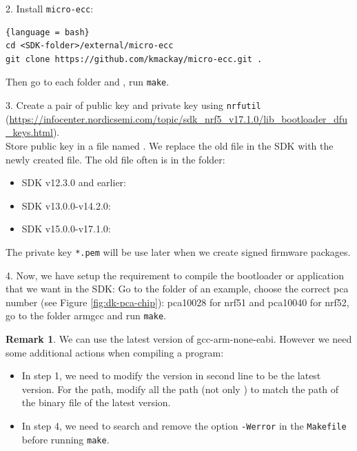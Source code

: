 \documentclass{article}
\theoremstyle{plain}
\theoremstyle{definition}
\newtheorem{remark}{Remark}
\numberwithin{equation}{section}
\begin{document}
2. Install \texttt{micro-ecc}:
\begin{lstlisting}{language = bash}
cd <SDK-folder>/external/micro-ecc
git clone https://github.com/kmackay/micro-ecc.git .
\end{lstlisting}
Then go to each folder  and , run \texttt{make}.

3. Create a pair of public key and private key using \texttt{nrfutil} (\url{https://infocenter.nordicsemi.com/topic/sdk_nrf5_v17.1.0/lib_bootloader_dfu_keys.html}).\\
Store public key in a file named . We replace the old file  in the SDK with the newly created file. The old file often is in the folder:
\begin{itemize}
	\item SDK v12.3.0 and earlier: 
	\item SDK v13.0.0-v14.2.0: 
	\item SDK v15.0.0-v17.1.0: 
\end{itemize}
The private key \texttt{*.pem} will be use later when we create signed firmware packages.

4. Now, we have setup the requirement to compile the bootloader or application that we want in the SDK: Go to the folder of an example, choose the correct pca number (see Figure \ref{fig:dk-pca-chip}): pca10028 for nrf51 and pca10040 for nrf52, go to the folder armgcc and run \texttt{make}.


\begin{remark}\label{gcc-latest}
	We can use the latest version of gcc-arm-none-eabi. However we need some additional actions when compiling a program:
	\begin{itemize}
		\item In step 1, we need to modify the version in second line to be the latest version. For the path, modify all the path (not only ) to match the path of the binary file of the latest version.
		\item In step 4, we need to search and remove the option \texttt{-Werror} in the \texttt{Makefile} before running \texttt{make}.
	\end{itemize}
\end{remark}
\end{document}
